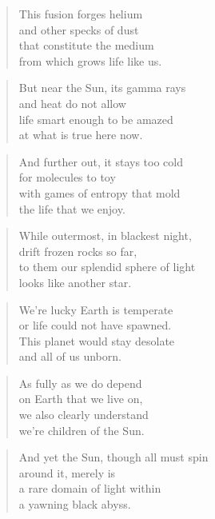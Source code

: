 \documentclass[14pt,a4paper]{article}
\begin{document}
\begin{verse}
This fusion forges helium\\
and other specks of dust\\
that constitute the medium\\
from which grows life like us.
\end{verse}

\begin{verse}
But near the Sun, its gamma rays\\
and heat do not allow\\
life smart enough to be amazed\\
at what is true here now.
\end{verse}

\begin{verse}
And further out, it stays too cold\\
for molecules to toy\\
with games of entropy that mold\\
the life that we enjoy.
\end{verse}

\begin{verse}
While outermost, in blackest night,\\
drift frozen rocks so far,\\
to them our splendid sphere of light\\
looks like another star.
\end{verse}

\begin{verse}
We’re lucky Earth is temperate\\
or life could not have spawned.\\
This planet would stay desolate\\
and all of us unborn.
\end{verse}

\begin{verse}
As fully as we do depend\\
on Earth that we live on,\\
we also clearly understand\\
we’re children of the Sun.
\end{verse}

\begin{verse}
And yet the Sun, though all must spin\\
around it, merely is\\
a rare domain of light within\\
a yawning black abyss.
\end{verse}
\end{document}
